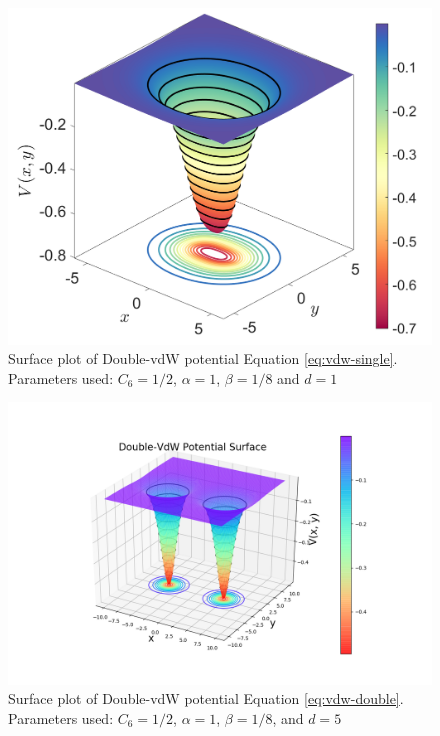 \documentclass[10pt,aps,onecolumn,superscriptaddress]{revtex4-2}
\begin{document}
\begin{figure}[htbp]
    \centering
    \includegraphics[scale=0.3]{CirquePES_c_1div2_a_1_b_1div8_d_1.png}
    \caption{Surface plot of Double-vdW potential Equation \eqref{eq:vdw-single}. Parameters used: $C_6 = 1/2$, $\alpha = 1$, $\beta = 1/8$ and $d = 1$}
    \label{fig:vdw-single_surface}
\end{figure}

\begin{figure}[htbp]
    \centering
    \includegraphics[scale=0.45]{double-vdw_surface.png}
    \caption{Surface plot of Double-vdW potential Equation \eqref{eq:vdw-double}. Parameters used: $C_6 = 1/2$, $\alpha = 1$, $\beta = 1/8$, and  $d = 5$ }
    \label{fig:vdw-double_surface}
\end{figure}
\end{document}
